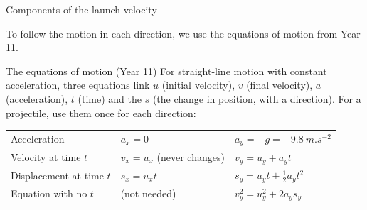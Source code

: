 \begin{formulacard}[notonsheet]{Components of the launch velocity}
  \begin{symbols}
  \end{symbols}
\end{formulacard}

To follow the motion in each direction, we use the equations of motion from Year 11.

\begin{refresher}{The equations of motion (Year 11)}
For straight-line motion with constant acceleration, three equations link $u$ (initial
velocity), $v$ (final velocity), $a$ (acceleration), $t$ (time) and the 
$s$ (the change in position, with a direction). For a projectile, use them once for each
direction:\par
\smallskip
\begin{tabular}{@{}L{32mm}L{40mm}L{56mm}@{}}
  \toprule
  &  & \\
  \midrule
  Acceleration & $a_x = 0$ & $a_y = -g = \qty{-9.8}{m.s^{-2}}$\\
  Velocity at time $t$ & $v_x = u_x$ (never changes) & $v_y = u_y + a_y t$\\
  Displacement at time $t$ & $s_x = u_x t$ & $s_y = u_y t + \frac{1}{2}a_y t^2$\\
  Equation with no $t$ & (not needed) & $v_y^2 = u_y^2 + 2a_y s_y$\\
  \bottomrule
\end{tabular}
\end{refresher}


